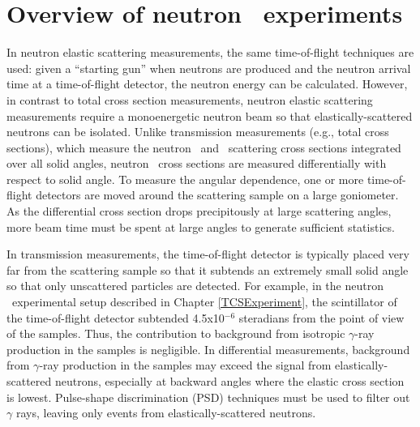 \section{Overview of neutron \el\ experiments}
In neutron elastic scattering measurements, the same time-of-flight techniques are used:
given a ``starting gun'' when neutrons are produced and the neutron arrival time
at a time-of-flight detector, the neutron energy can be calculated.
However, in contrast to total cross section measurements, neutron elastic scattering
measurements require a monoenergetic neutron beam so that elastically-scattered
neutrons can be isolated. Unlike transmission measurements (e.g., total cross
sections), which measure the neutron \el\ and \rxn\ scattering cross sections integrated
over all solid angles, neutron \el\ cross sections are measured differentially with respect to 
solid angle. To measure the angular dependence, one or more time-of-flight detectors
are moved around the scattering sample on a large goniometer. As the differential cross section 
drops precipitously at large scattering angles, more beam time must be spent at
large angles to generate sufficient statistics.

In transmission measurements, the time-of-flight detector is typically placed
very far from the scattering sample so that it subtends an extremely small solid
angle so that only unscattered particles are detected.
For example, in the neutron \tot\ experimental setup described in Chapter
\ref{TCSExperiment}, the scintillator of the time-of-flight detector subtended
4.5x10$^{-6}$ steradians from the point of view of the samples. Thus, the
contribution to background from isotropic $\gamma$-ray production in the samples is negligible.
In differential measurements,
background from $\gamma$-ray production in the samples may exceed the signal
from elastically-scattered neutrons, especially at backward angles where the elastic
cross section is lowest. Pulse-shape discrimination (PSD) techniques must be used to filter out 
$\gamma$ rays, leaving only events from elastically-scattered neutrons.

